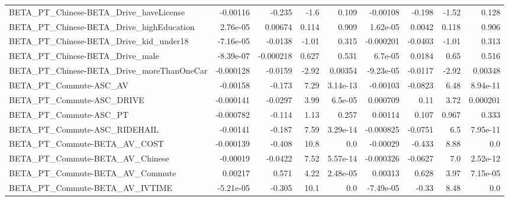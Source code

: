 \begin{tabular}{lrrrrrrrr}
BETA\_PT\_Chinese-BETA\_Drive\_haveLicense             &    -0.00116 &       -0.235 &     -1.6 &    0.109 &   -0.00108 &      -0.198 &        -1.52 &         0.128 \\
BETA\_PT\_Chinese-BETA\_Drive\_highEducation           &    2.76e-05 &      0.00674 &    0.114 &    0.909 &   1.62e-05 &      0.0042 &        0.118 &         0.906 \\
BETA\_PT\_Chinese-BETA\_Drive\_kid\_under18             &   -7.16e-05 &      -0.0138 &    -1.01 &    0.315 &  -0.000201 &     -0.0403 &        -1.01 &         0.313 \\
BETA\_PT\_Chinese-BETA\_Drive\_male                    &   -8.39e-07 &    -0.000218 &    0.627 &    0.531 &    6.7e-05 &      0.0184 &         0.65 &         0.516 \\
BETA\_PT\_Chinese-BETA\_Drive\_moreThanOneCar          &   -0.000128 &      -0.0159 &    -2.92 &  0.00354 &  -9.23e-05 &     -0.0117 &        -2.92 &       0.00348 \\
BETA\_PT\_Commute-ASC\_AV                             &    -0.00158 &       -0.173 &     7.29 & 3.14e-13 &   -0.00103 &     -0.0823 &         6.48 &      8.94e-11 \\
BETA\_PT\_Commute-ASC\_DRIVE                          &   -0.000141 &      -0.0297 &     3.99 &  6.5e-05 &   0.000709 &        0.11 &         3.72 &      0.000201 \\
BETA\_PT\_Commute-ASC\_PT                             &   -0.000782 &       -0.114 &     1.13 &    0.257 &    0.00114 &       0.107 &        0.967 &         0.333 \\
BETA\_PT\_Commute-ASC\_RIDEHAIL                       &    -0.00141 &       -0.187 &     7.59 & 3.29e-14 &  -0.000825 &     -0.0751 &          6.5 &      7.95e-11 \\
BETA\_PT\_Commute-BETA\_AV\_COST                       &   -0.000139 &       -0.408 &     10.8 &      0.0 &   -0.00029 &      -0.433 &         8.88 &           0.0 \\
BETA\_PT\_Commute-BETA\_AV\_Chinese                    &    -0.00019 &      -0.0422 &     7.52 & 5.57e-14 &  -0.000326 &     -0.0627 &          7.0 &      2.52e-12 \\
BETA\_PT\_Commute-BETA\_AV\_Commute                    &     0.00217 &        0.571 &     4.22 & 2.48e-05 &    0.00313 &       0.628 &         3.97 &      7.15e-05 \\
BETA\_PT\_Commute-BETA\_AV\_IVTIME                     &   -5.21e-05 &       -0.305 &     10.1 &      0.0 &  -7.49e-05 &       -0.33 &         8.48 &           0.0 \\

\end{tabular}
